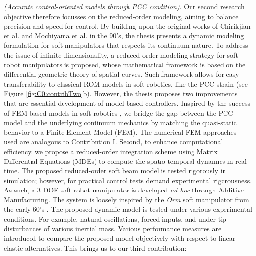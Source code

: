 \textit{(Accurate control-oriented models through PCC condition)}. Our second research objective therefore focusses on the reduced-order modeling, aiming to balance precision and speed for control. By building upon the original works of Chirikjian et al. \cite{Chirikjian1992} and Mochiyama et al. \cite{Mochiyama1992} in the 90's, the thesis presents a dynamic modeling formulation for soft manipulators that respects its continuum nature. To address the issue of infinite-dimensionality, a reduced-order modeling strategy for soft robot manipulators is proposed, whose mathematical framework is based on the differential geometric theory of spatial curves. Such framework allows for easy transferability to classical ROM models in soft robotics, like the PCC strain \cite{DellaSantina2020,Katzschmann2019,Falkenhahn2015} (see Figure \ref{fig:C0:contribTwo}b). However, the thesis proposes two improvements that are essential development of model-based controllers. Inspired by the success of FEM-based models in soft robotics \cite{Duriez2013,Goury2018}, we bridge the gap between the PCC model and the underlying continuum mechanics by matching the quasi-static behavior to a Finite Element Model (FEM). The numerical FEM approaches used are analogous to Contribution I. Second, to enhance computational efficiency, we propose a reduced-order integration scheme using Matrix Differential Equations (MDEs) to compute the spatio-temporal dynamics in real-time. The proposed reduced-order soft beam model is tested rigorously in simulation; however, for practical control tests demand experimental rigorousness. As such, a 3-DOF soft robot manipulator is developed \textit{ad-hoc} through Additive Manufacturing. The system is loosely inspired by the \textit{Orm} soft manipulator from the early 60's \cite{BibEntryOrm2019Sep}. The proposed dynamic model is tested under various experimental conditions. For example, natural oscillations, forced inputs, and under tip-disturbances of various inertial mass. Various performance measures are introduced to compare the proposed model objectively with respect to linear elastic alternatives. This brings us to our third contribution: 


